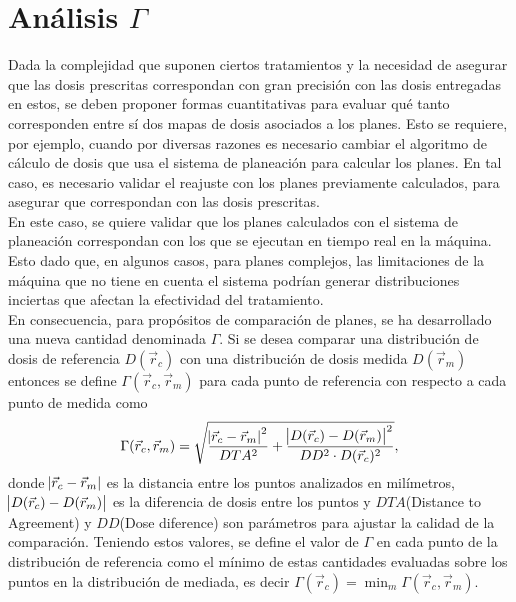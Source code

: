 \section{Análisis $\Gamma$}
Dada la complejidad que suponen ciertos tratamientos y la necesidad de asegurar que las dosis prescritas correspondan con gran precisión con las dosis entregadas en estos, se deben proponer formas cuantitativas para evaluar qué tanto corresponden entre sí dos mapas de dosis asociados a los planes. Esto se requiere, por ejemplo, cuando por diversas razones es necesario cambiar el algoritmo de cálculo de dosis que usa el sistema de planeación para calcular los planes. En tal caso, es necesario validar el reajuste con los planes previamente calculados, para asegurar que correspondan con las dosis prescritas.\cite{Winiecki2009}\cite{Li2011}\\

En este caso, se quiere validar que los planes calculados con el sistema de planeación correspondan con los que se ejecutan en tiempo real en la máquina. Esto dado que, en algunos casos, para planes complejos, las limitaciones de la máquina que no tiene en cuenta el sistema podrían generar distribuciones inciertas que afectan la efectividad del tratamiento.\\

En consecuencia, para propósitos de comparación de planes, se ha desarrollado una nueva cantidad denominada $\Gamma$. Si se desea comparar una distribución de dosis de referencia $D(\vec{r}_{c})$ con una distribución de dosis medida $D(\vec{r}_{m})$ entonces se define $\Gamma(\vec{r}_c,\vec{r}_m)$ para cada punto de referencia con respecto a cada punto de medida como 
\begin{equation}
\label{eqn:gamma}
\Gamma(\vec{r}_c,\vec{r}_m)=\sqrt{\frac{\abs{\vec{r}_c-\vec{r}_m}^2}{DTA^2}+\frac{\abs{D(\vec{r}_c)-D(\vec{r}_m)}^2}{DD^2\cdot D(\vec{r}_c)^2}},
\end{equation}
donde $\abs{\vec{r}_c-\vec{r}_m}$ es la distancia entre los puntos analizados en milímetros, ${\abs{D(\vec{r}_c)-D(\vec{r}_m)}}$ es la diferencia de dosis entre los puntos y $DTA$(Distance to Agreement) y $DD$(Dose diference) son parámetros para ajustar la calidad de la comparación. Teniendo estos valores, se define el valor de $\Gamma$ en cada punto de la distribución de referencia como el mínimo de estas cantidades evaluadas sobre los puntos en la distribución de mediada, es decir $\Gamma(\vec{r}_c)=\min_{m} \Gamma(\vec{r}_c,\vec{r}_m)$.\\

